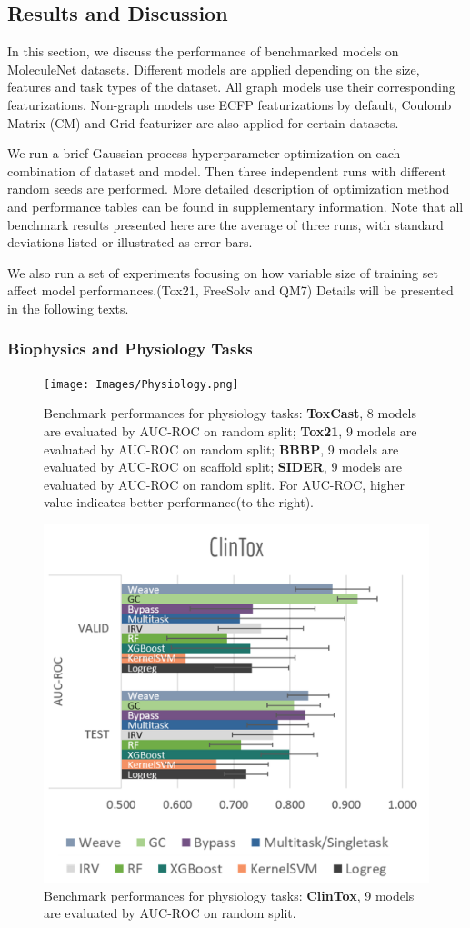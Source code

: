 \subsection{Results and Discussion}

In this section, we discuss the performance of benchmarked models on MoleculeNet datasets. Different models are applied depending on the size, features and task types of the dataset. All graph models use their corresponding featurizations. Non-graph models use ECFP featurizations by default, Coulomb Matrix (CM) and Grid featurizer are also applied for certain datasets.

We run a brief Gaussian process hyperparameter optimization on each combination of dataset and model. Then three independent runs with different random seeds are performed. More detailed description of optimization method and performance tables can be found in supplementary information\dag. Note that all benchmark results presented here are the average of three runs, with standard deviations listed or illustrated as error bars.

We also run a set of experiments focusing on how variable size of training set affect model performances.(Tox21, FreeSolv and QM7) Details will be presented in the following texts.

\subsubsection{Biophysics and Physiology Tasks}

\begin{figure}[!h]
  \centering
  \texttt{[image: Images/Physiology.png]}
  \caption{Benchmark performances for physiology tasks: \textbf{ToxCast}, 8 models are evaluated by AUC-ROC on random split; \textbf{Tox21}, 9 models are evaluated by AUC-ROC on random split; \textbf{BBBP}, 9 models are evaluated by AUC-ROC on scaffold split; \textbf{SIDER}, 9 models are evaluated by AUC-ROC on random split. For AUC-ROC, higher value indicates better performance(to the right).}
  \label{fig:ToxCast_BBBP_Tox21_SIDER}
\end{figure}

\begin{figure}[htbp]
  \centering
  \includegraphics[width=.425\textwidth]{Images/Physiology2.png}
  \caption{Benchmark performances for physiology tasks: \textbf{ClinTox}, 9 models are evaluated by AUC-ROC on random split.}
  \label{fig:ClinTox}
\end{figure}

